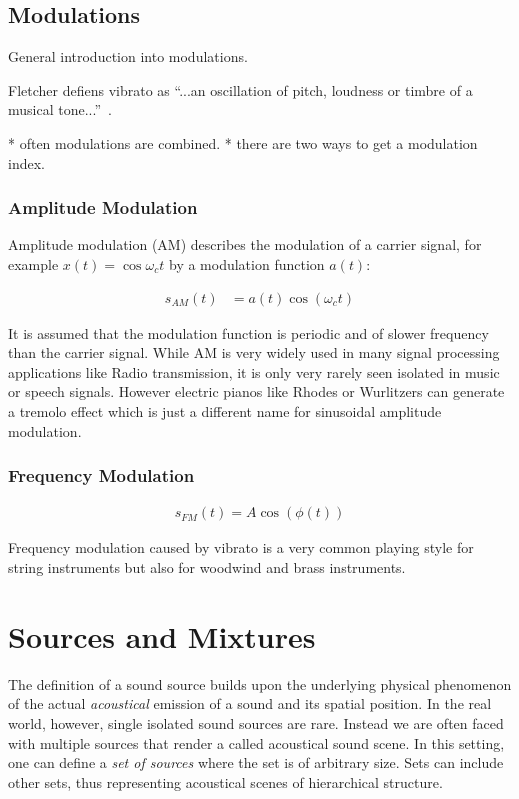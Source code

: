\subsection{Modulations}

General introduction into modulations.
\cite{abe98}

Fletcher defiens vibrato as ``...an oscillation of pitch, loudness or timbre of a musical tone...''~\cite{fletcher01}.

* often modulations are combined.
* there are two ways to get a modulation index.

\subsubsection{Amplitude Modulation}

Amplitude modulation (AM) describes the modulation of a carrier signal, for example \(x(t) = \cos \omega_c t\) by a modulation function \(a(t)\):

\begin{align}
    s_{AM}(t) &= a(t) \cos \left( \omega_{c} t\right)
\end{align}

It is assumed that the modulation function is periodic and of slower frequency than the carrier signal.
While AM is very widely used in many signal processing applications like Radio transmission, it is only very rarely seen isolated in music or speech signals.
However electric pianos like Rhodes or Wurlitzers can generate a tremolo effect which is just a different name for sinusoidal amplitude modulation.

\subsubsection{Frequency Modulation}
\begin{align}
    s_{FM}(t) = A \cos(\phi(t))
\end{align}

Frequency  modulation  caused  by  vibrato  is  a  very  common
playing  style  for  string  instruments  but  also  for  woodwind  and
brass instruments.

\hypertarget{sources-and-mixtures}{%
\section{Sources and Mixtures}\label{sources-and-mixtures}}

The definition of a sound source builds upon the underlying physical
phenomenon of the actual \emph{acoustical} emission of a sound and its
spatial position.
In the real world, however, single isolated sound sources are rare.
Instead we are often faced with multiple sources that render a called acoustical sound scene.
In this setting, one can define a \emph{set of sources} where the set is of arbitrary size.
Sets can include other sets, thus representing acoustical scenes of hierarchical structure.


